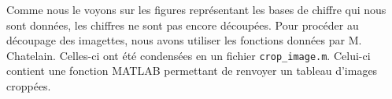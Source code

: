 Comme nous le voyons sur les figures représentant les bases 
de chiffre qui nous sont données, les chiffres ne sont pas 
encore découpées. Pour procéder au découpage des imagettes, nous
avons utiliser les fonctions données par M. Chatelain. Celles-ci
ont été condensées en un fichier \texttt{crop\_image.m}. Celui-ci
contient une fonction MATLAB permettant de renvoyer un tableau 
d'images croppées.